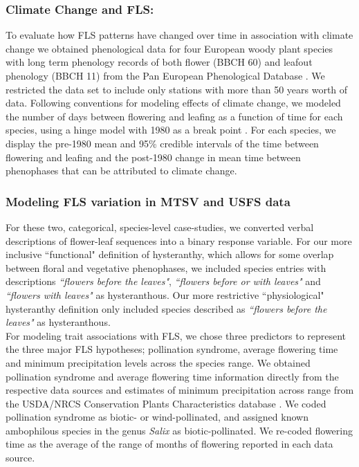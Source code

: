 \documentclass[12pt]{article}\usepackage[]{graphicx}\usepackage[]{color}
\begin{document}
\subsubsection*{Climate Change and FLS:}
To evaluate how FLS patterns have changed over time in association with climate change we obtained phenological data for four European woody plant species with long term phenology records of both flower (BBCH 60) and leafout phenology (BBCH 11) from the Pan European Phenological Database \citep{PEP725}. We restricted the data set to include only stations with more than 50 years worth of data. Following conventions for modeling effects of climate change, we modeled the number of days between flowering and leafing as a function of time for each species, using a hinge model with 1980 as a break point \citep{IPCC2013,Kharouba2018}. For each species, we display the pre-1980 mean and 95\% credible intervals of the time between flowering and leafing and the post-1980 change in mean time between phenophases that can be  attributed to climate change.

\subsubsection*{Modeling FLS variation in MTSV and USFS data}
For these two, categorical, species-level case-studies, we converted verbal descriptions of flower-leaf sequences into a binary response variable. For our more inclusive ``functional" definition of hysteranthy, which allows for some overlap between floral and vegetative phenophases, we included species entries with descriptions \textit{``flowers before the leaves"}, \textit{``flowers before or with leaves"} and \textit{``flowers with leaves"} as hysteranthous. Our more restrictive ``physiological" hysteranthy definition only included species described as \textit{``flowers before the leaves"} as hysteranthous.\\

\noindent For modeling trait associations with FLS, we chose three predictors to represent the three major FLS hypotheses; pollination syndrome, average flowering time and minimum precipitation levels across the species range. We obtained pollination syndrome and average flowering time information directly from the respective data sources and estimates of minimum precipitation across range from the USDA/NRCS Conservation Plants Characteristics database \citep{usdancrs}. We coded pollination syndrome as biotic- or wind-pollinated, and assigned known ambophilous species in the genus \textit{Salix} as biotic-pollinated. We re-coded flowering time as the average of the range of months of flowering reported in each data source.\\
\end{document}
